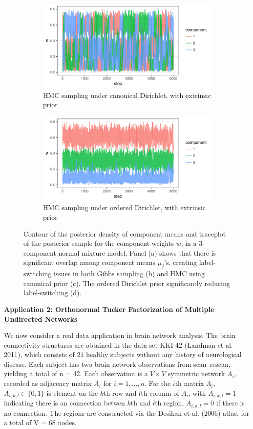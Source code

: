 \documentclass[10pt]{article}
\DeclareMathOperator{\1}{\mathbbm{1}}
\begin{document}
\begin{figure}[H]
\begin{subfigure}[b]{0.32\textwidth}
  \includegraphics[width=1\textwidth]{fmm_w_hmc_unordered.pdf}
    \caption{HMC sampling under canonical Dirichlet, with extrinsic prior}
      \end{subfigure}
       \begin{subfigure}[b]{0.32\textwidth}
 \includegraphics[width=1\textwidth]{fmm_w_hmc.pdf}
     \caption{HMC sampling under ordered Dirichlet, with extrinsic prior}
     \end{subfigure}
\caption{Contour of the posterior density of component means and traceplot of the posterior sample for the component weights $w$, in a 3-component normal mixture model. Panel (a) shows that there is significant overlap among component means $\mu_j$'s, creating label-switching issues in both Gibbs sampling (b) and HMC using canonical prior (c). The ordered Dirichlet prior significantly reducing label-switching (d).}
\label{dirichlet}
\end{figure}


{\bf Application 2: Orthonormal Tucker Factorization of Multiple Undirected Networks}

We now consider a real data application in brain network analysis. The brain connectivity structures are obtained in the data set KKI-42 (Landman et al. 2011), which consists of $21$ healthy subjects without any history of neurological disease. Each subject has two brain network observations from scan--rescan, yielding a total of n = 42. Each observation is a $V\times V$ symmetric network $A_i$, recorded as adjacency matrix $A_i$ for $i=1,\ldots,n$. For the $i$th matrix $A_i$, $A_{i,k,l} \in \{0,1\}$ is element on the $k$th row and $l$th column of $A_i$, with $A_{i,k,l}=1$ indicating there is an connection betwen $k$th and $l$th region, $A_{i,k,l}=0$ if there is no connection. The regions are constructed via the Desikan et al. (2006) atlas, for a total of V = 68 nodes.
\end{document}
